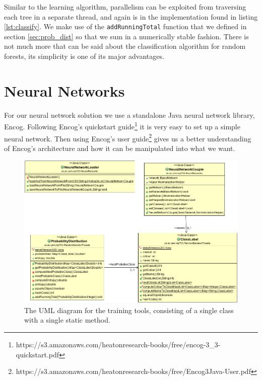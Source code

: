 \documentclass[12pt,twoside,notitlepage]{report}
\begin{document}
          Similar to the learning algorithm, parallelism can be exploited from traversing each tree in a separate 
          thread, and again is in the implementation found in listing \ref{lst:classify}. We make use of the 
          \texttt{addRunningTotal} function that we defined in section \ref{sec:prob_dist} so that we sum in a 
          numerically stable fashion. There is not much more that can be said about the classification algorithm for 
          random forests, its simplicity is one of its major advantages.






    \section{Neural Networks} \label{sec:nn_training} \label{sec:pixel_label}
        For our neural network solution we use a standalone Java neural network library, Encog. Following Encog's quickstart 
        guide\footnote{https://s3.amazonaws.com/heatonresearch-books/free/encog-3\_3-quickstart.pdf} it is very easy to 
        set up a simple neural network. Then using Encog's user 
        guide\footnote{https://s3.amazonaws.com/heatonresearch-books/free/Encog3Java-User.pdf} gives us a better 
        understanding of Encog's architecture and how it can be manipulated into what we want.         

        \begin{figure}
            \centering
            \includegraphics[scale=0.5]{NeuralNet_UML}
            \caption{The UML diagram for the training tools, consisting of a single class with a single static method.}
        \end{figure}
\end{document}
